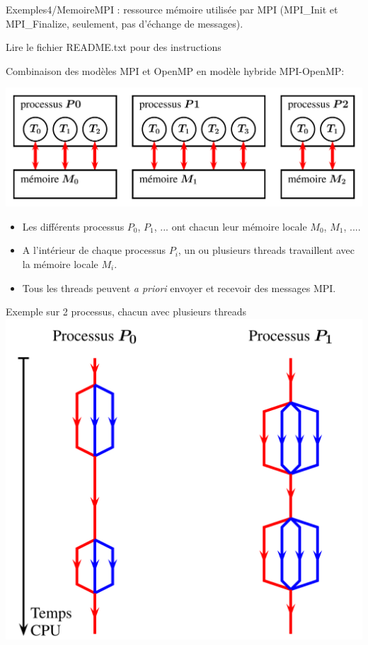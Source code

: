 \documentclass{beamer}
\begin{document}
\begin{frame}
	Exemples4/MemoireMPI : ressource mémoire utilisée par MPI (MPI\_Init et MPI\_Finalize, seulement, pas d'échange de messages).
	\bigskip
	
	Lire le fichier README.txt pour des instructions
\end{frame}

\begin{frame}
	Combinaison des modèles MPI et OpenMP en modèle hybride MPI-OpenMP:

\begin{center}
	\includegraphics[scale=0.45]{../../Images/modeleHybride}
\end{center}

\begin{itemize}
	\item Les différents processus $P_0$, $P_1$, ... ont chacun leur mémoire locale $M_0$, $M_1$, ....
	\item A l'intérieur de chaque processus $P_i$, un ou plusieurs threads travaillent avec la mémoire locale $M_i$.
	\item Tous les threads peuvent \textsl{a priori} envoyer et recevoir des messages MPI.
\end{itemize}
\end{frame}

\begin{frame}
	Exemple sur 2 processus, chacun avec plusieurs threads
	\includegraphics[scale=0.4]{../../Images/enchainementHybride1}
\end{frame}
\end{document}
